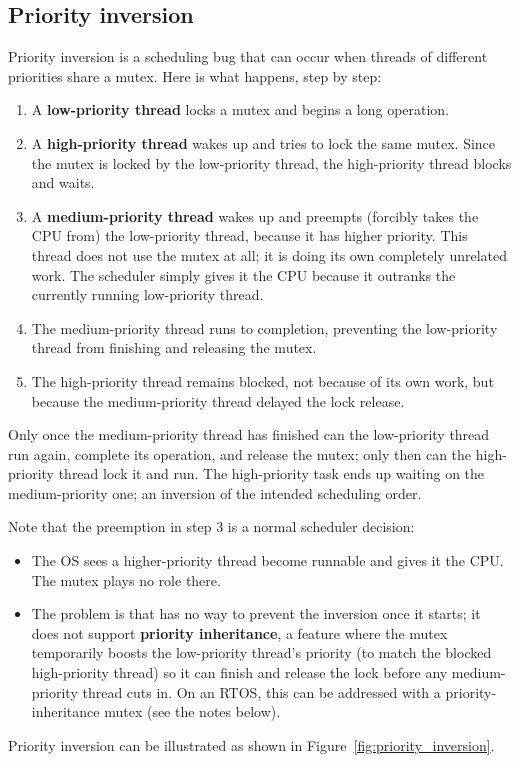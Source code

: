 \subsection{Priority inversion}
\label{c6:sec:inversion}
Priority inversion is a scheduling bug that can occur when threads of different priorities share a
mutex. Here is what happens, step by step:
\begin{enumerate}
  \item A \textbf{low-priority thread} locks a mutex and begins a long operation.
  \item A \textbf{high-priority thread} wakes up and tries to lock the same mutex. Since the mutex
    is locked by the low-priority thread, the high-priority thread blocks and waits.
  \item A \textbf{medium-priority thread} wakes up and preempts (forcibly takes the CPU from) the
    low-priority thread, because it has higher priority. This thread does not use the mutex at
    all; it is doing its own completely unrelated work. The scheduler simply gives it the CPU
    because it outranks the currently running low-priority thread.
  \item The medium-priority thread runs to completion, preventing the low-priority thread from
    finishing and releasing the mutex.
  \item The high-priority thread remains blocked, not because of its own work, but because the
    medium-priority thread delayed the lock release.
\end{enumerate}
Only once the medium-priority thread has finished can the low-priority thread run again, complete
its operation, and release the mutex; only then can the high-priority thread lock it and run. The
high-priority task ends up waiting on the medium-priority one; an inversion of the intended
scheduling order.

Note that the preemption in step 3 is a normal scheduler decision:
\begin{itemize}
  \item The OS sees a higher-priority thread become runnable and gives it the CPU. The mutex plays
    no role there.
  \item The problem is that  has no way to prevent the inversion once it starts;
    it does not support \textbf{priority inheritance}, a feature where the mutex temporarily boosts
    the low-priority thread's priority (to match the blocked high-priority thread) so it can finish
    and release the lock before any medium-priority thread cuts in. On an RTOS, this can be
    addressed with a priority-inheritance mutex (see the notes below).
\end{itemize}
Priority inversion can be illustrated as shown in Figure~\ref{fig:priority_inversion}.

